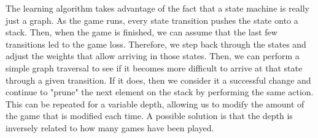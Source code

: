 The learning algorithm takes advantage of the fact that a state machine is really just a graph. As the game runs, every state transition pushes the state onto a stack. Then, when the game is finished, we can assume that the last few transitions led to the game loss. Therefore, we step back through the states and adjust the weights that allow arriving in those states. Then, we can perform a simple graph traversal to see if it becomes more difficult to arrive at that state through a given transition. If it does, then we consider it a successful change and continue to "prune" the next element on the stack by performing the same action. This can be repeated for a variable depth, allowing us to modify the amount of the game that is modified each time. A possible solution is that the depth is inversely related to how many games have been played.

